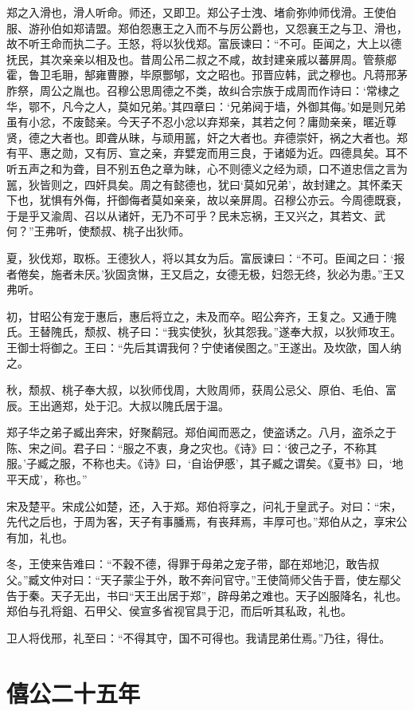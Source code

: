 \documentclass[a4paper,12pt,UTF8,twoside]{ctexbook}
\begin{document}
郑之入滑也，滑人听命。师还，又即卫。郑公子士洩、堵俞弥帅师伐滑。王使伯服、游孙伯如郑请盟。郑伯怨惠王之入而不与厉公爵也，又怨襄王之与卫、滑也，故不听王命而执二子。王怒，将以狄伐郑。富辰谏曰：“不可。臣闻之，大上以德抚民，其次亲亲以相及也。昔周公吊二叔之不咸，故封建亲戚以蕃屏周。管蔡郕霍，鲁卫毛耼，郜雍曹滕，毕原酆郇，文之昭也。邘晋应韩，武之穆也。凡蒋邢茅胙祭，周公之胤也。召穆公思周德之不类，故纠合宗族于成周而作诗曰：‘常棣之华，鄂不，凡今之人，莫如兄弟。’其四章曰：‘兄弟阋于墙，外御其侮。’如是则兄弟虽有小忿，不废懿亲。今天子不忍小忿以弃郑亲，其若之何？庸勋亲亲，暱近尊贤，德之大者也。即聋从昧，与顽用嚚，奸之大者也。弃德崇奸，祸之大者也。郑有平、惠之勋，又有厉、宣之亲，弃嬖宠而用三良，于诸姬为近。四德具矣。耳不听五声之和为聋，目不别五色之章为昧，心不则德义之经为顽，口不道忠信之言为嚚，狄皆则之，四奸具矣。周之有懿德也，犹曰‘莫如兄弟’，故封建之。其怀柔天下也，犹惧有外侮，扞御侮者莫如亲亲，故以亲屏周。召穆公亦云。今周德既衰，于是乎又渝周、召以从诸奸，无乃不可乎？民未忘祸，王又兴之，其若文、武何？”王弗听，使颓叔、桃子出狄师。

夏，狄伐郑，取栎。王德狄人，将以其女为后。富辰谏曰：“不可。臣闻之曰：‘报者倦矣，施者未厌。’狄固贪惏，王又启之，女德无极，妇怨无终，狄必为患。”王又弗听。

初，甘昭公有宠于惠后，惠后将立之，未及而卒。昭公奔齐，王复之。又通于隗氏。王替隗氏，颓叔、桃子曰：“我实使狄，狄其怨我。”遂奉大叔，以狄师攻王。王御士将御之。王曰：“先后其谓我何？宁使诸侯图之。”王遂出。及坎欿，国人纳之。

秋，颓叔、桃子奉大叔，以狄师伐周，大败周师，获周公忌父、原伯、毛伯、富辰。王出適郑，处于氾。大叔以隗氏居于温。

郑子华之弟子臧出奔宋，好聚鹬冠。郑伯闻而恶之，使盗诱之。八月，盗杀之于陈、宋之间。君子曰：“服之不衷，身之灾也。《诗》曰：‘彼己之子，不称其服。’子臧之服，不称也夫。《诗》曰，‘自诒伊慼’，其子臧之谓矣。《夏书》曰，‘地平天成’，称也。”

宋及楚平。宋成公如楚，还，入于郑。郑伯将享之，问礼于皇武子。对曰：“宋，先代之后也，于周为客，天子有事膰焉，有丧拜焉，丰厚可也。”郑伯从之，享宋公有加，礼也。

冬，王使来告难曰：“不穀不德，得罪于母弟之宠子带，鄙在郑地氾，敢告叔父。”臧文仲对曰：“天子蒙尘于外，敢不奔问官守。”王使简师父告于晋，使左鄢父告于秦。天子无出，书曰“天王出居于郑”，辟母弟之难也。天子凶服降名，礼也。郑伯与孔将鉏、石甲父、侯宣多省视官具于氾，而后听其私政，礼也。

卫人将伐邢，礼至曰：“不得其守，国不可得也。我请昆弟仕焉。”乃往，得仕。

\section{僖公二十五年}
\end{document}
